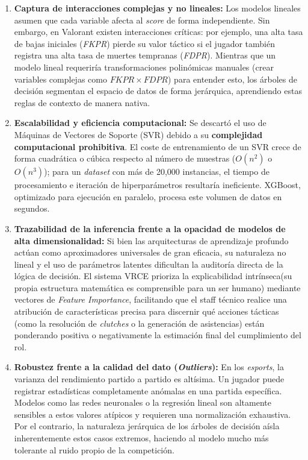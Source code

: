 \documentclass{ULBreport} %
\begin{document}
\begin{enumerate}
    \item \textbf{Captura de interacciones complejas y no lineales:} Los modelos lineales asumen que cada variable afecta al \textit{score} de forma independiente. Sin embargo, en Valorant existen interacciones críticas: por ejemplo, una alta tasa de bajas iniciales (\textit{FKPR}) pierde su valor táctico si el jugador también registra una alta tasa de muertes tempranas (\textit{FDPR}). Mientras que un modelo lineal requeriría transformaciones polinómicas manuales (crear variables complejas como $FKPR \times FDPR$) para entender esto, los árboles de decisión segmentan el espacio de datos de forma jerárquica, aprendiendo estas reglas de contexto de manera nativa.
    
    \item \textbf{Escalabilidad y eficiencia computacional:} Se descartó el uso de Máquinas de Vectores de Soporte (SVR) debido a su \textbf{complejidad computacional prohibitiva}. El coste de entrenamiento de un SVR crece de forma cuadrática o cúbica respecto al número de muestras ($O(n^2)$ o $O(n^3)$); para un \textit{dataset} con más de 20,000 instancias, el tiempo de procesamiento e iteración de hiperparámetros resultaría ineficiente. XGBoost, optimizado para ejecución en paralelo, procesa este volumen de datos en segundos.
    
    \item \textbf{Trazabilidad de la inferencia frente a la opacidad de modelos de alta dimensionalidad:} Si bien las arquitecturas de aprendizaje profundo actúan como aproximadores universales de gran eficacia, su naturaleza no lineal y el uso de parámetros latentes dificultan la auditoría directa de la lógica de decisión. El sistema VRCE prioriza la explicabilidad intrínseca(su propia estructura matemática es comprensible para un ser humano) mediante vectores de \textit{Feature Importance}, facilitando que el staff técnico realice una atribución de características precisa para discernir qué acciones tácticas (como la resolución de \textit{clutches} o la generación de asistencias) están ponderando positiva o negativamente la estimación final del cumplimiento del rol.

    \item \textbf{Robustez frente a la calidad del dato (\textit{Outliers}):}
    En los \textit{esports}, la varianza del rendimiento partido a partido es altísima. Un jugador puede registrar estadísticas completamente anómalas en una partida específica. Modelos como las redes neuronales o la regresión lineal son altamente sensibles a estos valores atípicos y requieren una normalización exhaustiva. Por el contrario, la naturaleza jerárquica de los árboles de decisión aísla inherentemente estos casos extremos, haciendo al modelo mucho más tolerante al ruido propio de la competición.

\end{enumerate}
\end{document}
